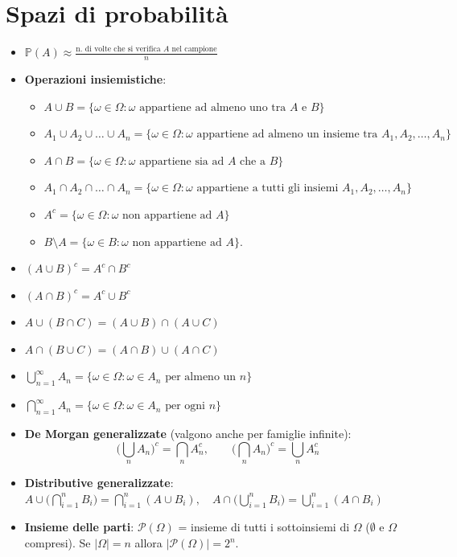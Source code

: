 \documentclass[12pt]{extarticle} %
\begin{document}
\section{Spazi di probabilità}
\begin{itemize}
    \item $ \mathbb{P}(A) \approx \frac{\text{n. di volte che si verifica } A \text{ nel campione}}{n} $
    
    \item \textbf{Operazioni insiemistiche}:
        \begin{itemize}
            \item $A \cup B = \{\omega \in \Omega : \omega \text{ appartiene ad almeno uno tra } A \text{ e } B\}$
            \item $A_1 \cup A_2 \cup \dots \cup A_n = \{\omega \in \Omega : \omega \text{ appartiene ad almeno un insieme tra } A_1, A_2, \dots, A_n\}$
            \item $A \cap B = \{\omega \in \Omega : \omega \text{ appartiene sia ad } A \text{ che a } B\}$
            \item $A_1 \cap A_2 \cap \dots \cap A_n = \{\omega \in \Omega : \omega \text{ appartiene a tutti gli insiemi } A_1, A_2, \dots, A_n\}$
            \item $A^c = \{\omega \in \Omega : \omega \text{ non appartiene ad } A\}$
            \item $ B \setminus A = \{\omega \in B : \omega \text{ non appartiene ad } A\}. $
        \end{itemize}

    \vspace{0.3cm}
    
    \item $ (A \cup B)^c = A^c \cap B^c $
    \item $ (A \cap B)^c = A^c \cup B^c $

    \item $ A \cup (B \cap C) = (A \cup B) \cap (A \cup C) $
    \item $ A \cap (B \cup C) = (A \cap B) \cup (A \cap C) $

    \item $ \bigcup_{n=1}^{\infty} A_n = \{\omega \in \Omega : \omega \in A_n \text{ per almeno un } n\} $
    \item $ \bigcap_{n=1}^{\infty} A_n = \{\omega \in \Omega : \omega \in A_n \text{ per ogni } n\} $

    \item \textbf{De Morgan generalizzate} (valgono anche per famiglie infinite):
    $$ \Big(\bigcup_{n} A_n\Big)^c = \bigcap_n A_n^c, \qquad \Big(\bigcap_n A_n\Big)^c = \bigcup_n A_n^c $$

    \item \textbf{Distributive generalizzate}:
    $ A \cup \big(\bigcap_{i=1}^n B_i\big) = \bigcap_{i=1}^n (A \cup B_i), \quad A \cap \big(\bigcup_{i=1}^n B_i\big) = \bigcup_{i=1}^n (A \cap B_i) $

    \item \textbf{Insieme delle parti}: $\mathcal{P}(\Omega)$ = insieme di tutti i sottoinsiemi di $\Omega$ ($\emptyset$ e $\Omega$ compresi). Se $|\Omega| = n$ allora $ |\mathcal{P}(\Omega)| = 2^n $.
\end{itemize}
\end{document}

